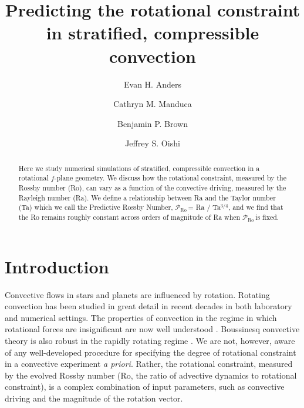 \documentclass[twocolumn, amsmath, amsfonts, amssymb]{aastex62}
\newcommand{\pro}{\ensuremath{\mathcal{P}_{\text{Ro}}\,}}
\begin{document}
\newcommand{\AB}{\citetalias{anders&brown2017}}

\title{Predicting the rotational constraint in stratified, compressible convection}


\author{Evan H. Anders}
\author{Cathryn M. Manduca}
\author{Benjamin P. Brown}
\author{Jeffrey S. Oishi}


\begin{abstract}
Here we study numerical simulations of stratified, compressible convection in a
rotational $f$-plane geometry. We discuss how the rotational constraint,
measured by the Rossby number (Ro), can vary as a function of the convective driving,
measured by the Rayleigh number (Ra). We define a relationship between Ra and the
Taylor number (Ta) which we call the Predictive Rossby Number, 
\pro = Ra / Ta$^{3/4}$, and we find that the Ro remains roughly constant
across orders of magnitude of Ra when \pro is fixed. 
\end{abstract}


\section{Introduction}
\label{sec:intro}
Convective flows in stars and planets are influenced by rotation. 
Rotating convection has been studied in great detail in
recent decades in both laboratory and numerical settings. The
properties of convection in the regime in which rotational forces are
insignificant are now well understood \citep{king&all2009, zhong&all2009, 
cheng&all2015}. Boussinesq convective theory is also robust
in the rapidly rotating regime \citep{julien&all2012, stellmach&all2014,
gastine&all2016}. We are not, however, aware of any well-developed
procedure for specifying the degree of rotational constraint
in a convective experiment \emph{a priori}. Rather, the rotational
constraint, measured by the evolved Rossby number
(Ro, the ratio of advective dynamics to rotational constraint), is a complex
combination of input parameters, such as convective driving and the
magnitude of the rotation vector.
\end{document}
